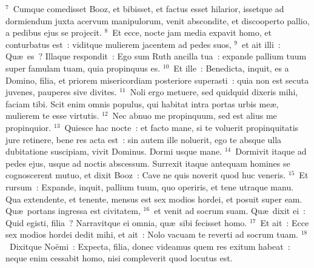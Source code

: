 ${}^{7}$~Cumque comedisset Booz, et bibisset, et factus esset hilarior, issetque ad dormiendum juxta acervum manipulorum, venit abscondite, et discooperto pallio, a pedibus ejus se projecit.
${}^{8}$~Et ecce, nocte jam media expavit homo, et conturbatus est~: viditque mulierem jacentem ad pedes suos,
${}^{9}$~et ait illi~: Qu\ae\ es~? Illaque respondit~: Ego sum Ruth ancilla tua~: expande pallium tuum super famulam tuam, quia propinquus es.
${}^{10}$~Et ille~: Benedicta, inquit, es a Domino, filia, et priorem misericordiam posteriore superasti~: quia non est secuta juvenes, pauperes sive divites.
${}^{11}$~Noli ergo metuere, sed quidquid dixeris mihi, faciam tibi. Scit enim omnis populus, qui habitat intra portas urbis me\ae , mulierem te esse virtutis.
${}^{12}$~Nec abnuo me propinquum, sed est alius me propinquior.
${}^{13}$~Quiesce hac nocte~: et facto mane, si te voluerit propinquitatis jure retinere, bene res acta est~: sin autem ille noluerit, ego te absque ulla dubitatione suscipiam, vivit Dominus. Dormi usque mane.
${}^{14}$~Dormivit itaque ad pedes ejus, usque ad noctis abscessum. Surrexit itaque antequam homines se cognoscerent mutuo, et dixit Booz~: Cave ne quis noverit quod huc veneris.
${}^{15}$~Et rursum~: Expande, inquit, pallium tuum, quo operiris, et tene utraque manu. Qua extendente, et tenente, mensus est sex modios hordei, et posuit super eam. Qu\ae\ portans ingressa est civitatem,
${}^{16}$~et venit ad socrum suam. Qu\ae\ dixit ei~: Quid egisti, filia~? Narravitque ei omnia, qu\ae\ sibi fecisset homo.
${}^{17}$~Et ait~: Ecce sex modios hordei dedit mihi, et ait~: Nolo vacuam te reverti ad socrum tuam.
${}^{18}$~Dixitque No\"emi~: Expecta, filia, donec videamus quem res exitum habeat~: neque enim cessabit homo, nisi compleverit quod locutus est.

